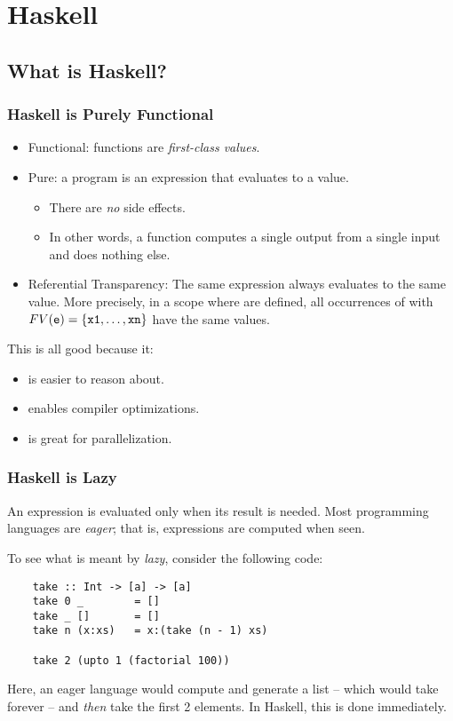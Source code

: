 \documentclass[letterpaper]{article}
\begin{document}
\section{Haskell}

\subsection{What is Haskell?}
\subsubsection{Haskell is Purely Functional}
\begin{itemize}
    \item Functional: functions are \emph{first-class values}.
    \item Pure: a program is an expression that evaluates to a value. 
    \begin{itemize}
        \item There are \emph{no} side effects. 
        \item In other words, a function  computes a single  output from a single  input and does nothing else. 
    \end{itemize}
    \item Referential Transparency: The same expression always evaluates to the same value. More precisely, in a scope where  are defined, all occurrences of  with $FV(\texttt{e}) = \{\texttt{x1}, \dots, \texttt{xn}\}$ have the same values. 
\end{itemize}
This is all good because it:
\begin{itemize}
    \item is easier to reason about. 
    \item enables compiler optimizations. 
    \item is great for parallelization. 
\end{itemize}

\subsubsection{Haskell is Lazy}
An expression is evaluated only when its result is needed. Most programming languages are \emph{eager}; that is, expressions are computed when seen. 

\bigskip

To see what is meant by \emph{lazy}, consider the following code:
\begin{verbatim}
    take :: Int -> [a] -> [a]
    take 0 _        = []
    take _ []       = []
    take n (x:xs)   = x:(take (n - 1) xs)

    take 2 (upto 1 (factorial 100))
\end{verbatim}
Here, an eager language would compute  and generate a list -- which would take forever -- and \emph{then} take the first 2 elements. In Haskell, this is done immediately.
\end{document}

